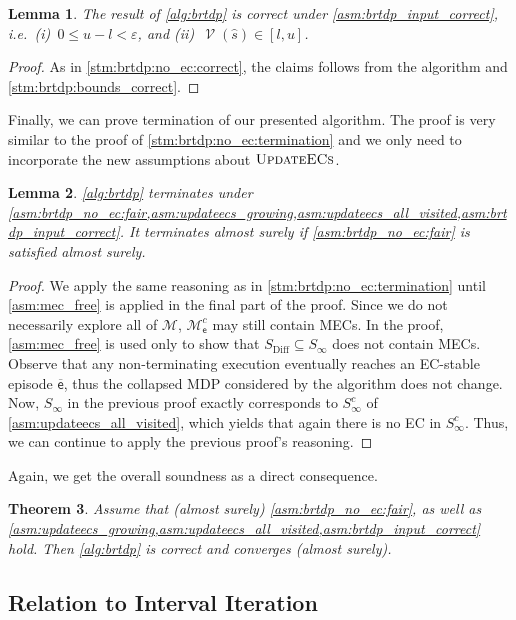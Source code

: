 \documentclass{article}
\newtheorem{theorem}{Theorem}\newtheorem{lemma}[theorem]{Lemma}\newtheorem{proposition}[theorem]{Proposition}\newtheorem{corollary}[theorem]{Corollary}\newtheorem{definition}[theorem]{Definition}\newtheorem{claim}[theorem]{Claim}\newtheorem{remark}[theorem]{Remark}\newtheorem{observation}[theorem]{Observation}\newtheorem{conjecture}[theorem]{Conjecture}\newtheorem{example}[theorem]{Example}
\newcommand{\MDP}{\mathcal{M}}
\newcommand{\States}{S}
\newcommand{\initialstate}{\hat{s}}
\DeclareMathOperator{\val}{\mathcal{V}}
\newcommand{\bounddifference}{\mathrm{Diff}}
\newcommand{\updateecs}{\textsc{UpdateECs}}
\newcommand{\algoepisode}{\mathsf{e}}
\begin{document}
\begin{lemma} \label{stm:brtdp:correct}
	The result of \cref{alg:brtdp} is correct under \cref{asm:brtdp_input_correct}, i.e.\ (i)~$0 \leq u - l < \varepsilon$, and (ii)~$\val(\initialstate) \in [l, u]$.
\end{lemma}

\begin{proof}
	As in \cref{stm:brtdp:no_ec:correct}, the claims follows from the algorithm and \cref{stm:brtdp:bounds_correct}. 
\end{proof}

Finally, we can prove termination of our presented algorithm.
The proof is very similar to the proof of \cref{stm:brtdp:no_ec:termination} and we only need to incorporate the new assumptions about $\updateecs$.

\begin{lemma} \label{stm:brtdp:terminates}
	\cref{alg:brtdp} terminates under \cref{asm:brtdp_no_ec:fair,asm:updateecs_growing,asm:updateecs_all_visited,asm:brtdp_input_correct}.
	It terminates almost surely if \cref{asm:brtdp_no_ec:fair} is satisfied almost surely.
\end{lemma}

\begin{proof}
	We apply the same reasoning as in \cref{stm:brtdp:no_ec:termination} until \cref{asm:mec_free} is applied in the final part of the proof.
	Since we do not necessarily explore all of $\MDP$, $\MDP^c_\algoepisode$ may still contain MECs.
	In the proof, \cref{asm:mec_free} is used only to show that $\States_\bounddifference \subseteq \States_\infty$ does not contain MECs.
	Observe that any non-terminating execution eventually reaches an EC-stable episode $\overline{\algoepisode}$, thus the collapsed MDP considered by the algorithm does not change.
	Now, $\States_\infty$ in the previous proof exactly corresponds to $\States_\infty^c$ of \cref{asm:updateecs_all_visited}, which yields that again there is no EC in $\States_\infty^c$.
	Thus, we can continue to apply the previous proof's reasoning. 
\end{proof}
Again, we get the overall soundness as a direct consequence.
\begin{theorem}
	Assume that (almost surely) \cref{asm:brtdp_no_ec:fair}, as well as \cref{asm:updateecs_growing,asm:updateecs_all_visited,asm:brtdp_input_correct} hold.
	Then \cref{alg:brtdp} is correct and converges (almost surely).
\end{theorem}

\subsection{Relation to Interval Iteration}
\end{document}
